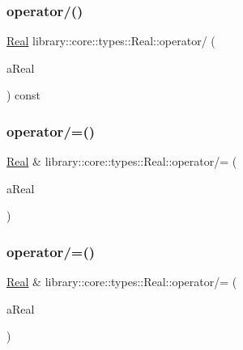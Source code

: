 \subsubsection{\texorpdfstring{operator/()}{operator/()}\hspace{0.1cm}{\footnotesize\ttfamily [2/2]}}
{\footnotesize\ttfamily \hyperlink{classlibrary_1_1core_1_1types_1_1Real}{Real} library\+::core\+::types\+::\+Real\+::operator/ (\begin{DoxyParamCaption}\item[{const \hyperlink{classlibrary_1_1core_1_1types_1_1Real_a9c5c8826b7e5a8e39544d23fea6c0e1c}{Real\+::\+Value\+Type} \&}]{a\+Real }\end{DoxyParamCaption}) const}

\mbox{\label{classlibrary_1_1core_1_1types_1_1Real_adc661a93f109f10500738a77439c975d}} 
\subsubsection{\texorpdfstring{operator/=()}{operator/=()}\hspace{0.1cm}{\footnotesize\ttfamily [1/2]}}
{\footnotesize\ttfamily \hyperlink{classlibrary_1_1core_1_1types_1_1Real}{Real} \& library\+::core\+::types\+::\+Real\+::operator/= (\begin{DoxyParamCaption}\item[{const \hyperlink{classlibrary_1_1core_1_1types_1_1Real}{Real} \&}]{a\+Real }\end{DoxyParamCaption})}

\mbox{\label{classlibrary_1_1core_1_1types_1_1Real_a6a9a6530460f746c7e7fdbba3b6932fe}} 
\subsubsection{\texorpdfstring{operator/=()}{operator/=()}\hspace{0.1cm}{\footnotesize\ttfamily [2/2]}}
{\footnotesize\ttfamily \hyperlink{classlibrary_1_1core_1_1types_1_1Real}{Real} \& library\+::core\+::types\+::\+Real\+::operator/= (\begin{DoxyParamCaption}\item[{const \hyperlink{classlibrary_1_1core_1_1types_1_1Real_a9c5c8826b7e5a8e39544d23fea6c0e1c}{Real\+::\+Value\+Type} \&}]{a\+Real }\end{DoxyParamCaption})}

